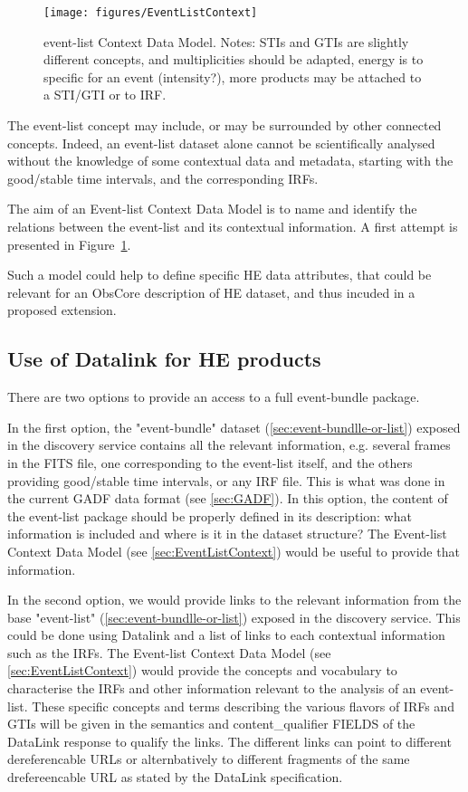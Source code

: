 \documentclass[11pt,a4paper]{ivoa}
\begin{document}
{\begin{figure}
\centering
\texttt{[image: figures/EventListContext]}
\caption{event-list Context Data Model. Notes: \gls{STI}s and \gls{GTI}s are slightly different concepts, and multiplicities should be adapted, energy is to specific for an event (intensity?), more products may be attached to a \gls{STI}/\gls{GTI} or to \gls{IRF}.}
\label{fig:EventListContext}
\end{figure}

The event-list concept may include, or may be surrounded by other connected concepts. Indeed, an event-list dataset alone cannot be scientifically analysed without the knowledge of some contextual data and metadata, starting with the good/stable time intervals, and the corresponding \gls{IRF}s.

The aim of an Event-list Context Data Model is to name and identify the relations between the event-list and its contextual information. A first attempt is presented in Figure~\ref{fig:EventListContext}.

Such a model could help to define specific \gls{HE} data attributes, that could be relevant for an ObsCore description of \gls{HE} dataset, and thus incuded in a proposed extension.


\subsection{Use of Datalink for HE products}
\label{sec:datalink}

There are two options to provide an access to a full event-bundle package.

In the first option, the "event-bundle" dataset (\ref{sec:event-bundlle-or-list}) exposed in the discovery service  contains all the relevant information, e.g. several frames in the \gls{FITS} file, one corresponding to the event-list itself, and the others providing good/stable time intervals, or any \gls{IRF} file. This is what was done in the current \gls{GADF} data format (see \ref{sec:GADF}). In this option, the content of the event-list package should be properly defined in its description: what information is included and where is it in the dataset structure? The Event-list Context Data Model (see \ref{sec:EventListContext}) would be useful to provide that information.

In the second option, we would provide links to the relevant information from the base "event-list" (\ref{sec:event-bundlle-or-list}) exposed in the discovery service. This could be done using Datalink and a list of links to each contextual information such as the \gls{IRF}s. The Event-list Context Data Model (see \ref{sec:EventListContext}) would provide the concepts and vocabulary to characterise the \gls{IRF}s and other information relevant to the analysis of an event-list. These specific concepts and terms describing the various flavors of \gls{IRF}s and \gls{GTI}s will be given in the semantics and content\_qualifier FIELDS of the DataLink response to qualify the links. The different links can point to different
dereferencable URLs or alternbatively to different fragments of the same drefereencable URL as stated by the DataLink specification.


}
\end{document}

